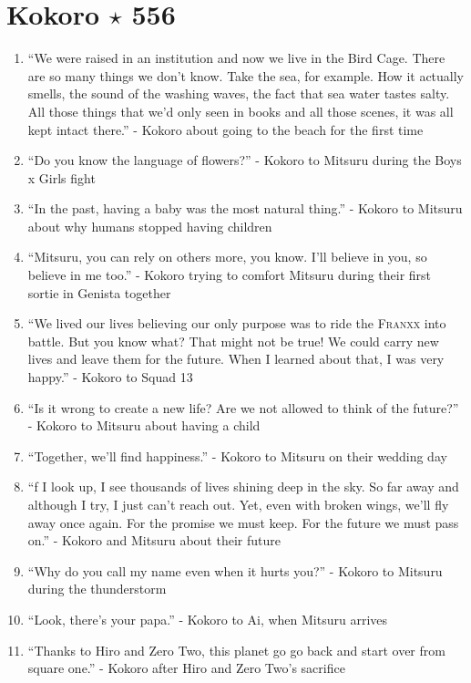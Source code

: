 \documentclass{book}
\numberwithin{equation}{section}
\begin{document}
\section{Kokoro $\star$ 556}
\begin{enumerate}
    \item ``We were raised in an institution and now we live in the Bird Cage. There are so many things we don't know. Take the sea, for example. How it actually smells, the sound of the washing waves, the fact that sea water tastes salty. All those things that we'd only seen in books and all those scenes, it was all kept intact there.'' - Kokoro about going to the beach for the first time
    \item ``Do you know the language of flowers?'' - Kokoro to Mitsuru during the Boys x Girls fight
    \item ``In the past, having a baby was the most natural thing.'' - Kokoro to Mitsuru about why humans stopped having children
    \item ``Mitsuru, you can rely on others more, you know. I'll believe in you, so believe in me too.'' - Kokoro trying to comfort Mitsuru during their first sortie in Genista together
    \item ``We lived our lives believing our only purpose was to ride the \textsc{Franxx} into battle. But you know what? That might not be true! We could carry new lives and leave them for the future. When I learned about that, I was very happy.'' - Kokoro to Squad 13
    \item ``Is it wrong to create a new life? Are we not allowed to think of the future?'' - Kokoro to Mitsuru about having a child
    \item ``Together, we'll find happiness.'' - Kokoro to Mitsuru on their wedding day
    \item ``f I look up, I see thousands of lives shining deep in the sky. So far away and although I try, I just can't reach out. Yet, even with broken wings, we'll fly away once again. For the promise we must keep. For the future we must pass on.'' - Kokoro and Mitsuru about their future
    \item ``Why do you call my name even when it hurts you?'' - Kokoro to Mitsuru during the thunderstorm
    \item ``Look, there's your papa.'' - Kokoro to Ai, when Mitsuru arrives
    \item ``Thanks to Hiro and Zero Two, this planet go go back and start over from square one.'' - Kokoro after Hiro and Zero Two's sacrifice
\end{enumerate}
\end{document}
